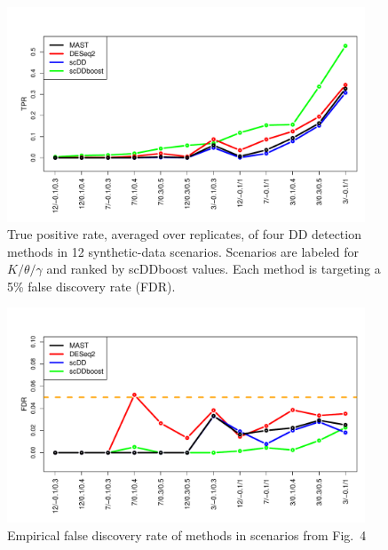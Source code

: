 \documentclass[aoas,preprint]{imsart}
\begin{document}
\begin{figure}[H]
  \includegraphics[width = 0.95\textwidth]{Figs/simuTPR.pdf}
  \caption{True positive rate, averaged over replicates, of four DD detection methods in 12 synthetic-data scenarios. 
  Scenarios are labeled for $K / \theta / \gamma$  and ranked by scDDboost values. Each method
 is targeting a 5\% false discovery rate (FDR).
   }
  \label{fig:4}
\end{figure}




\begin{figure}[H]
  \includegraphics[width = 0.95\textwidth]{Figs/simuFDR.pdf}
  \caption{Empirical false discovery rate of methods in scenarios from Fig.~4 }
  \label{fig:5}
\end{figure}
\end{document}
